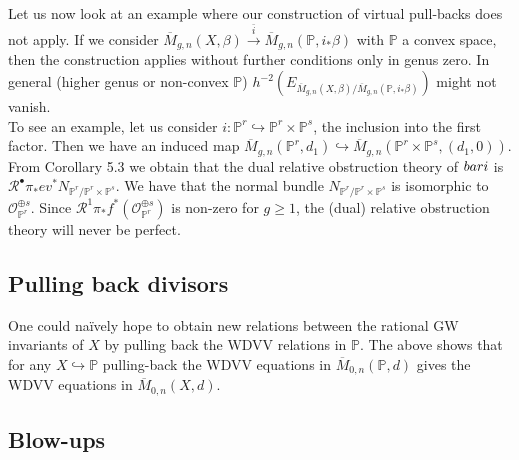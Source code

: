 \begin{example}\label{manolacheVirtualPullbacks2012-ex-5.8}
Let us now look at an example where our construction of virtual pull-backs does not apply. If we consider $\overline{M}_{g,n}(X,\beta)\stackrel{\bar{i}}{\rightarrow}\overline{M}_{g,n}(\mathbb{P}, i_*\beta)$ with $\mathbb{P}$ a convex space, then the construction applies without further conditions only in genus zero. In general (higher genus or non-convex $\mathbb{P}$) $h^{-2}(E_{\overline{M}_{g,n}(X,\beta)/\overline{M}_{g,n}(\mathbb{P}, i_*\beta)})$ might not vanish.
\\To see an example, let us consider $i:\mathbb{P}^r\hookrightarrow\mathbb{P}^r\times\mathbb{P}^s$, the inclusion into the first factor. Then we have an induced map $\overline{M}_{g,n}(\mathbb{P}^r,d_1)\hookrightarrow\overline{M}_{g,n}(\mathbb{P}^r\times\mathbb{P}^s,(d_1,0))$. From Corollary 5.3 we obtain that the dual relative obstruction theory of $\\bar{i}$ is $\mathcal{R}^{\bullet}\pi_*ev^*N_{\mathbb{P}^r/\mathbb{P}^r\times\mathbb{P}^s}$. We have that the normal bundle $N_{\mathbb{P}^r/\mathbb{P}^r\times\mathbb{P}^s}$ is isomorphic to $\mathcal{O}_{\mathbb{P}^r}^{\oplus s}$. Since $\mathcal{R}^{1}\pi_*f^*(\mathcal{O}_{\mathbb{P}^r}^{\oplus s})$ is non-zero for $g\geq1$, the (dual) relative obstruction theory will never be perfect.
\end{example}

\subsection{Pulling back divisors}\label{manolacheVirtualPullbacks2012-sec-5.2}

\begin{remark}\label{manolacheVirtualPullbacks2012-rem-5.9}
One could na\"ively hope to obtain new relations between the rational GW invariants of $X$ by pulling back the WDVV relations in $\mathbb{P}$. The above shows that for any $X\hookrightarrow\mathbb{P}$ pulling-back the WDVV equations in $\overline{M}_{0,n}(\mathbb{P},d)$ gives the WDVV equations in $\overline{M}_{0,n}(X,d)$.
\end{remark}

\subsection{Blow-ups}\label{manolacheVirtualPullbacks2012-sec-5.3}

